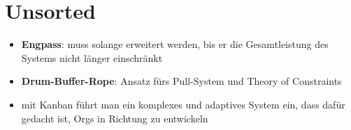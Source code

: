 \section{Unsorted}
\begin{itemize}
  \item \textbf{Engpass}: muss solange erweitert werden, bis er die Gesamtleistung des Systems nicht
    länger einschränkt
  \item \textbf{Drum-Buffer-Rope}: Ansatz fürs Pull-System und Theory of Constraints
  \item mit Kanban führt man ein komplexes und adaptives System ein, dass dafür gedacht ist, Orgs in
    Richtung  zu entwickeln
\end{itemize}




